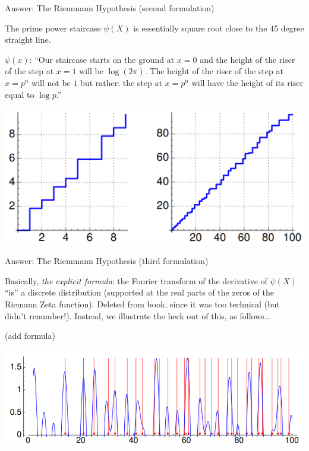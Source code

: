 \documentclass{beamer}
\begin{document}
\begin{frame}{Answer: The Riemmann Hypothesis  (second formulation)}
  \begin{block}{}
    The prime power staircase $\psi(X)$ is essentially square root close
    to the 45 degree straight line.
  \end{block}

  $\psi(x)$: ``Our staircase starts on the ground at $x=0$ and the height of the
  riser of the step at $x=1$ will be $\log(2\pi)$. The height of the
  riser of the step at $x=p^n$ will not be $1$
  but rather: the step at $x=p^n$ will have the height of its riser
  equal to $\log p$.''

\begin{center}
\includegraphics[height=.4\textheight]{pics/psi.png}
\end{center}
\end{frame}

\begin{frame}{Answer: The Riemmann Hypothesis (third formulation)}
  \begin{block}{}
    Basically, \textit{the explicit formula}: the Fourier transform
    of the derivative of $\psi(X)$ ``is'' a discrete distribution (supported
    at the real parts of the zeros of the Riemann Zeta function).
    Deleted from book, since it was too technical (but didn't renumber!).  Instead, we illustrate the heck out of this, as follows...
  \end{block}

  
\end{frame}

\begin{frame}{}

(add formula)

\includegraphics[height=.42\textheight]{pics/prime-power-freq-5.png}

\end{frame}
\end{document}
